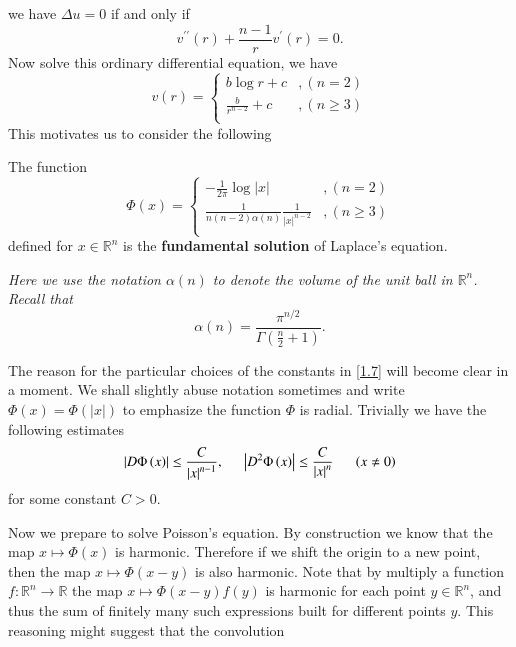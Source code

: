 we have $\Delta u=0$ if and only if 
$$
v^{\prime\prime}\left( r \right) +\frac{n-1}{r}v^{\prime}\left( r \right) =0.
$$
Now solve this ordinary differential equation, we have 
$$
v\left( r \right) =\left\{ \begin{aligned}
	b\log r+c&,\left( n=2 \right)\\
	\frac{b}{r^{n-2}}+c&,\left( n\ge 3 \right)\\
\end{aligned} \right. 
$$
This motivates us to consider the following
\begin{definition}
The function 
\begin{equation}\label{1.7}
\Phi \left( x \right) =\left\{ \begin{aligned}
	-\frac{1}{2\pi}\log \left| x \right|&,\left( n=2 \right)\\
	\frac{1}{n\left( n-2 \right) \alpha \left( n \right)}\frac{1}{\left| x \right|^{n-2}}&,\left( n\ge 3 \right)\\
\end{aligned} \right. 
\end{equation}
defined for $x\in\mathbb{R}^n$ is the \textbf{fundamental solution} of Laplace's equation.
\end{definition}
\begin{note}\em
Here we use the notation $\alpha(n)$ to denote the volume of the unit ball in $\mathbb{R}^n$. Recall that 
$$
\alpha \left( n \right) =\frac{\pi ^{n/2}}{\Gamma \left( \frac{n}{2}+1 \right)}.
$$
\end{note}
The reason for the particular choices of the constants in \eqref{1.7} will become clear in a moment. We shall slightly abuse notation sometimes and write $\Phi(x)=\Phi(|x|)$ to emphasize the function $\Phi$ is radial. Trivially we have the following estimates 
$$
\left| D\Phi \left( x \right) \right|\le \frac{C}{\left| x \right|^{n-1}},\hspace{0.5cm}\left| D^2\Phi \left( x \right) \right|\le \frac{C}{\left| x \right|^n}\hspace{0.5cm}\left( x\ne 0 \right) 
$$
for some constant $C>0$.\par
Now we prepare to solve Poisson's equation. By construction we know that the map $x\mapsto\Phi(x)$ is harmonic. Therefore if we shift the origin to a new point, then the map $x\mapsto\Phi(x-y)$ is also harmonic. Note that by multiply a function $f:\mathbb{R}^n\to\mathbb{R}$ the map $x\mapsto\Phi(x-y)f(y)$ is harmonic for each point $y\in\mathbb{R}^n$, and thus the sum of finitely many such expressions built for different points $y$. This reasoning might suggest that the convolution 
